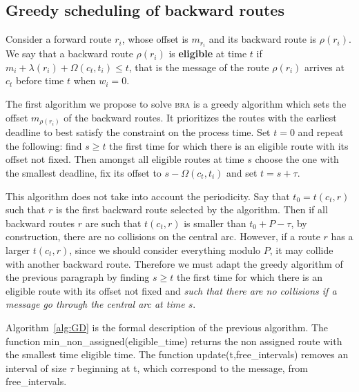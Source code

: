 \documentclass[10pt, conference, letterpaper]{IEEEtran}
\newcommand\bra{\textsc{bra}\xspace}
\begin{document}
   \subsection{Greedy scheduling of backward routes}
    
    Consider a forward route $r_i$, whose offset is $m_{r_i}$ and its backward route is $\rho(r_i)$.
    We say that a backward route $\rho(r_i)$ is {\bf eligible} at time $t$ if $m_{i} +  \lambda(r_i) + \Omega(c_t,t_i) \leq t$, that is the message of the route $\rho(r_i)$ arrives at $c_t$ before time $t$ when $w_i = 0$.
    
    The first algorithm we propose to solve \bra is a greedy algorithm which sets the offset $m_{\rho(r_i)}$ of the 
    backward routes. It prioritizes the routes with the earliest deadline to best satisfy the
    constraint on the process time. Set $t=0$ and repeat the following: find $s \geq t$ the first time for which there is an eligible route with its offset not fixed. Then amongst all eligible routes at time $s$ choose the one with the smallest deadline, fix its offset to $s - \Omega(c_t,t_i) $ and set $t = s + \tau$.
    
    This algorithm does not take into account the periodicity. Say that $t_0 = t(c_t,r)$ such that $r$ is the first backward route selected by the algorithm. Then if all backward routes $r$ are such that $t(c_t,r)$ is smaller than $t_0 + P - \tau$,
    by construction, there are no collisions on the central arc.
    However, if a route $r$ has a larger $t(c_t,r)$, since we should consider everything modulo $P$, 
    it may collide with another backward route. Therefore we must adapt the greedy algorithm of the previous paragraph by finding $s \geq t$ the first time for which there is an eligible route with its offset not fixed and \emph{such that there are no collisions if a message go through the central arc at time $s$}. 
    
    Algorithm~\ref{alg:GD} is the formal description of the previous algorithm. 
     The function  min\_non\_assigned(eligible\_time) returns the non assigned route with the smallest time eligible time. The function update(t,free\_intervals) removes an interval of size $\tau$ beginning at t, which correspond to the message,  from free\_intervals.
     
\end{document}
